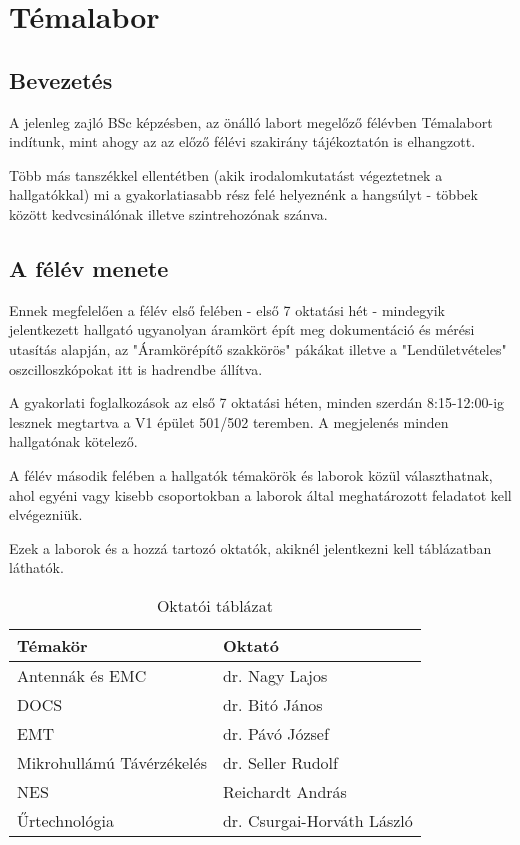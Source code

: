 \chapter{Témalabor}

\section{Bevezetés}

A jelenleg zajló BSc képzésben, az önálló labort megelőző félévben Témalabort indítunk, mint ahogy az az előző félévi szakirány tájékoztatón is elhangzott.

Több más tanszékkel ellentétben (akik irodalomkutatást végeztetnek a hallgatókkal) mi a gyakorlatiasabb rész felé helyeznénk a hangsúlyt - többek között kedvcsinálónak illetve szintrehozónak szánva.

\section{A félév menete}

Ennek megfelelően a félév első felében - első 7 oktatási hét - mindegyik jelentkezett hallgató ugyanolyan áramkört épít meg dokumentáció és mérési utasítás alapján, az "Áramkörépítő szakkörös" pákákat illetve a "Lendületvételes" oszcilloszkópokat itt is hadrendbe állítva. \cite{hvthonlap}

A gyakorlati foglalkozások az első 7 oktatási héten, minden szerdán 8:15-12:00-ig lesznek megtartva a V1 épület 501/502 teremben. A megjelenés minden hallgatónak kötelező.

A félév második felében a hallgatók témakörök és laborok közül választhatnak, ahol egyéni vagy kisebb csoportokban a laborok által meghatározott feladatot kell elvégezniük.

Ezek a laborok és a hozzá tartozó oktatók, akiknél jelentkezni kell  táblázatban láthatók.

\begin{table}[hb]
        \footnotesize
        \centering
        \caption{Oktatói táblázat}
        \begin{tabular}{ | l | l |}
        \hline
        Témakör & Oktató\\
        \hline
 		Antennák és EMC & dr. Nagy Lajos \\
 		DOCS & dr. Bitó János \\
 		EMT & dr. Pávó József \\
 		Mikrohullámú Távérzékelés & dr. Seller Rudolf \\
 		NES & Reichardt András \\
 		Űrtechnológia & dr. Csurgai-Horváth László \\
        \hline
        \end{tabular}
        \label{tab:laborok_es_oktatok}
\end{table}

